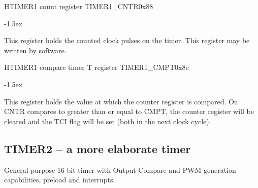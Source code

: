 \documentclass[12pt]{article}
\begin{document}
\begin{register}{H}{TIMER1 count register TIMER1\_CNTR}{0x88}
\label{timer1cntr}
%
\regnewline%
\end{register}
\begin{regdesc}[0.8\textwidth]\begin{reglist}[00000]
\itemsep-1.5ex
\item[CNTR] This register holds the counted clock pulses on the timer. This register may be written by software.
\end{reglist}\end{regdesc}

\begin{register}{H}{TIMER1 compare timer T register TIMER1\_CMPT}{0x8c}
\label{timer1cmpt}
%
\regnewline%
\end{register}
\begin{regdesc}[0.8\textwidth]\begin{reglist}[00000]
\itemsep-1.5ex
\item[CMPT] This register holds the value at which the counter register is compared. On CNTR compares to greater than or equal to CMPT, the counter register will be cleared and the TCI flag will be set (both in the next clock cycle).
\end{reglist}\end{regdesc}

\subsection{TIMER2 -- a more elaborate timer}
General purpose 16-bit timer with Output Compare and PWM generation capabilities, preload and interrupts.
\end{document}
